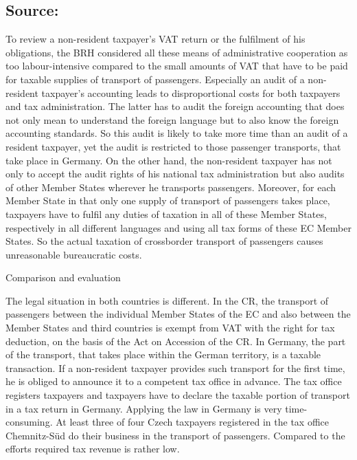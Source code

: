 \documentclass[10pt]{article}
\begin{document}
\subsection*{Source:}

To review a non-resident taxpayer’s VAT return or the fulfilment of his obligations, the BRH considered all these means of administrative cooperation as too labour-intensive compared to the small amounts of VAT that have to be paid for taxable supplies of transport of passengers.
Especially an audit of a non-resident taxpayer’s accounting leads to disproportional costs for both taxpayers and tax administration.
The latter has to audit the foreign accounting that does not only mean to understand the foreign language but to also know the foreign accounting standards.
So this audit is likely to take more time than an audit of a resident taxpayer, yet the audit is restricted to those passenger transports, that take place in Germany.
On the other hand, the non-resident taxpayer has not only to accept the audit rights of his national tax administration but also audits of other Member States wherever he transports passengers.
Moreover, for each Member State in that only one supply of transport of passengers takes place, taxpayers have to fulfil any duties of taxation in all of these Member States, respectively in all different languages and using all tax forms of these EC Member States.
So the actual taxation of crossborder transport of passengers causes unreasonable bureaucratic costs.


Comparison and evaluation

The legal situation in both countries is different.
In the CR, the transport of passengers between the individual Member States of the EC and also between the Member States and third countries is exempt from VAT with the right for tax deduction, on the basis of the Act on Accession of the CR.
In Germany, the part of the transport, that takes place within the German territory, is a taxable transaction.
If a non-resident taxpayer provides such transport for the first time, he is obliged to announce it to a competent tax office in advance.
The tax office registers taxpayers and taxpayers have to declare the taxable portion of transport in a tax return in Germany.
Applying the law in Germany is very time-consuming.
At least three of four Czech taxpayers registered in the tax office Chemnitz-Süd do their business in the transport of passengers.
Compared to the efforts required tax revenue is rather low.


\pagebreak
\end{document}
